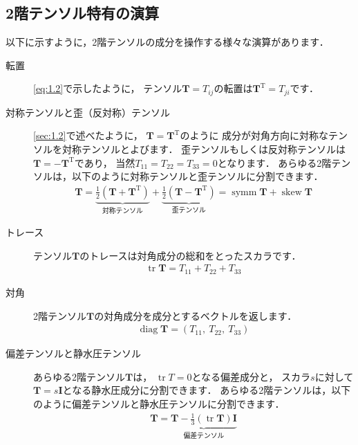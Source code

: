 \subsection{2階テンソル特有の演算}
\label{ssec:1.3.9}
以下に示すように，2階テンソルの成分を操作する様々な演算があります．
\begin{description}
 \item[転置] \autoref{eq:1.2}で示したように，
            テンソル$\bm{T} = T_{ij}$の転置は$\bm{T}^{\mathrm{T}} = T_{ji}$です．
 \item[対称テンソルと歪（反対称）テンソル] \autoref{sec:1.2}で述べたように，
            $\bm{T} = \bm{T}^{\mathrm{T}}$のように
            成分が対角方向に対称なテンソルを対称テンソルとよびます．
            歪テンソルもしくは反対称テンソルは$\bm{T} = -\bm{T}^{\mathrm{T}}$であり，
            当然$T_{11} = T_{22} = T_{33} = 0$となります．
            あらゆる2階テンソルは，以下のように対称テンソルと歪テンソルに分割できます．
            \begin{align}
             \label{eq:1.31}
             \bm{T} = \underbrace{\frac{1}{2}(\bm{T} + \bm{T}^{\mathrm{T}})}_{\text{対称テンソル}}
             + \underbrace{\frac{1}{2}(\bm{T} - \bm{T}^{\mathrm{T}})}_{\text{歪テンソル}}
             = \mathop{\mathrm{symm}}\bm{T} + \mathop{\mathrm{skew}}\bm{T}
            \end{align}
 \item[トレース] テンソル$\bm{T}$のトレースは対角成分の総和をとったスカラです．
            \begin{align}
             \label{eq:1.32}
             \mathop{\mathrm{tr}}\bm{T} = T_{11} + T_{22} + T_{33}
            \end{align}
 \item[対角] 2階テンソル$\bm{T}$の対角成分を成分とするベクトルを返します．
            \begin{align}
             \label{eq:1.33}
             \mathop{\mathrm{diag}}\bm{T} = (T_{11},\ T_{22},\ T_{33})
            \end{align}
 \item[偏差テンソルと静水圧テンソル] あらゆる2階テンソル$\bm{T}$は，
            $\mathop{\mathrm{tr}}T = 0$となる偏差成分と，
            スカラ$s$に対して$\bm{T} = s\bm{I}$となる静水圧成分に分割できます．
            あらゆる2階テンソルは，以下のように偏差テンソルと静水圧テンソルに分割できます．
            \begin{align}
             \label{eq:1.34}
             \bm{T} = \underbrace{\bm{T}
             - \frac{1}{3}(\mathop{\mathrm{tr}}\bm{T})\bm{I}}_{\text{偏差テンソル}}

\end{align}
\end{description}
